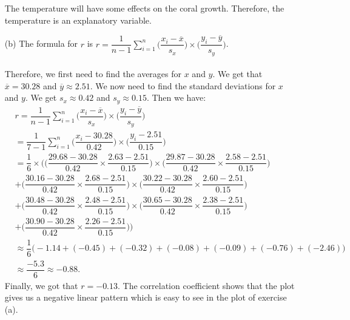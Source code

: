 \documentclass[11pt, a4paper]{article}
\begin{document}
\begin{itemize}
\begin{itemize}
\item[]
\item[]
\begin{center}
\end{center}
\item[]
\item[]
The temperature will have some effects on the coral growth.
Therefore, the temperature is an explanatory variable.

\item[]

\item[(b)]
The formula for $r$ is $r = \dfrac{1}{n - 1} \displaystyle\sum_{i = 1}^n \Big(\dfrac{x_i - \overline{x}}{s_x}\Big) \times \Big(\dfrac{y_i - \overline{y}}{s_y}\Big)$.\\\\
Therefore, we first need to find the averages for $x$ and $y$.
We get that $\overline{x} = 30.28$ and $\overline{y} \approx 2.51$.
We now need to find the standard deviations for $x$ and $y$.
We get $s_x \approx 0.42$ and $s_y \approx 0.15$.
Then we have:
\begin{align*}
&r = \dfrac{1}{n - 1} \displaystyle\sum_{i = 1}^n \Big(\dfrac{x_i - \overline{x}}{s_x}\Big) \times \Big(\dfrac{y_i - \overline{y}}{s_y}\Big)\\
&= \dfrac{1}{7 - 1} \displaystyle\sum_{i = 1}^n \Big(\dfrac{x_i - 30.28}{0.42}\Big) \times \Big(\dfrac{y_i - 2.51}{0.15}\Big)\\
&= \dfrac{1}{6} \times \Bigg(\Big(\dfrac{29.68 - 30.28}{0.42} \times \dfrac{2.63 - 2.51}{0.15}\Big) \times \Big(\dfrac{29.87 - 30.28}{0.42} \times \dfrac{2.58 - 2.51}{0.15}\Big)\\
&+ \Big(\dfrac{30.16 - 30.28}{0.42} \times \dfrac{2.68 - 2.51}{0.15}\Big) \times \Big(\dfrac{30.22 - 30.28}{0.42} \times \dfrac{2.60 - 2.51}{0.15}\Big)\\
&+ \Big(\dfrac{30.48 - 30.28}{0.42} \times \dfrac{2.48 - 2.51}{0.15}\Big) \times \Big(\dfrac{30.65 - 30.28}{0.42} \times \dfrac{2.38 - 2.51}{0.15}\Big)\\
&+ \Big(\dfrac{30.90 - 30.28}{0.42} \times \dfrac{2.26 - 2.51}{0.15}\Big)\Bigg)\\
&\approx\dfrac{1}{6} \big(-1.14 + (-0.45) + (-0.32) + (-0.08) + (-0.09) + (-0.76) + (-2.46)\big)\\
&\approx \dfrac{-5.3}{6} \approx -0.88.
\end{align*}
Finally, we got that $r = -0.13$. The correlation coefficient
shows that the plot gives us a negative linear pattern which
is easy to see in the plot of exercise (a).
\end{itemize}


\end{itemize}
\end{document}
